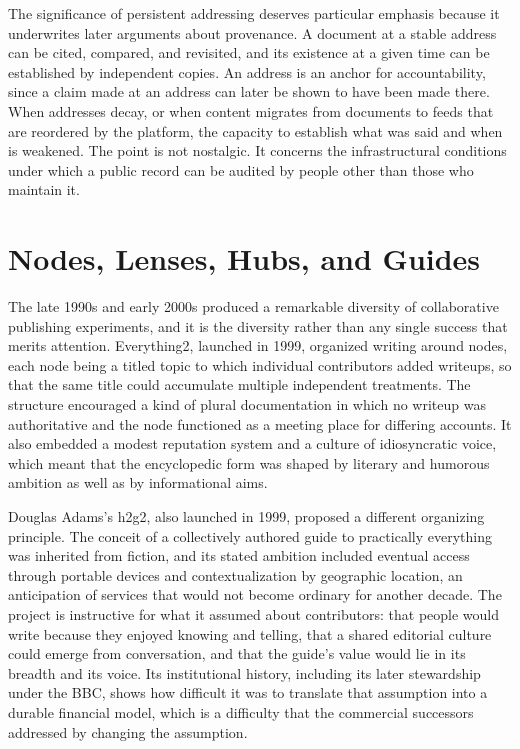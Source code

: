\documentclass[11pt]{article}
\theoremstyle{remark}
\begin{document}
The significance of persistent addressing deserves particular emphasis because it underwrites later arguments about provenance. A document at a stable address can be cited, compared, and revisited, and its existence at a given time can be established by independent copies. An address is an anchor for accountability, since a claim made at an address can later be shown to have been made there. When addresses decay, or when content migrates from documents to feeds that are reordered by the platform, the capacity to establish what was said and when is weakened. The point is not nostalgic. It concerns the infrastructural conditions under which a public record can be audited by people other than those who maintain it.

\section{Nodes, Lenses, Hubs, and Guides}

The late 1990s and early 2000s produced a remarkable diversity of collaborative publishing experiments, and it is the diversity rather than any single success that merits attention. Everything2, launched in 1999, organized writing around nodes, each node being a titled topic to which individual contributors added writeups, so that the same title could accumulate multiple independent treatments. The structure encouraged a kind of plural documentation in which no writeup was authoritative and the node functioned as a meeting place for differing accounts. It also embedded a modest reputation system and a culture of idiosyncratic voice, which meant that the encyclopedic form was shaped by literary and humorous ambition as well as by informational aims.

Douglas Adams's h2g2, also launched in 1999, proposed a different organizing principle. The conceit of a collectively authored guide to practically everything was inherited from fiction, and its stated ambition included eventual access through portable devices and contextualization by geographic location, an anticipation of services that would not become ordinary for another decade. The project is instructive for what it assumed about contributors: that people would write because they enjoyed knowing and telling, that a shared editorial culture could emerge from conversation, and that the guide's value would lie in its breadth and its voice. Its institutional history, including its later stewardship under the BBC, shows how difficult it was to translate that assumption into a durable financial model, which is a difficulty that the commercial successors addressed by changing the assumption.
\end{document}
